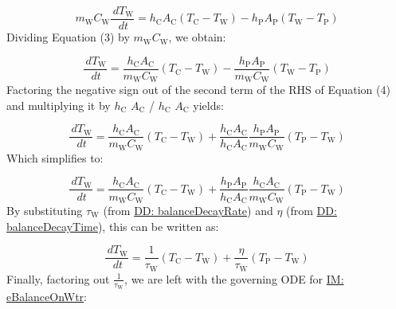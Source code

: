 \documentclass[12pt]{article}
\begin{document}
\begin{displaymath}
{m_{\text{W}}} {C_{\text{W}}} \frac{\,d{T_{\text{W}}}}{\,dt}={h_{\text{C}}} {A_{\text{C}}} \left({T_{\text{C}}}-{T_{\text{W}}}\right)-{h_{\text{P}}} {A_{\text{P}}} \left({T_{\text{W}}}-{T_{\text{P}}}\right)
\end{displaymath}
Dividing Equation (3) by ${m_{\text{W}}} {C_{\text{W}}}$, we obtain:

\begin{displaymath}
\frac{\,d{T_{\text{W}}}}{\,dt}=\frac{{h_{\text{C}}} {A_{\text{C}}}}{{m_{\text{W}}} {C_{\text{W}}}} \left({T_{\text{C}}}-{T_{\text{W}}}\right)-\frac{{h_{\text{P}}} {A_{\text{P}}}}{{m_{\text{W}}} {C_{\text{W}}}} \left({T_{\text{W}}}-{T_{\text{P}}}\right)
\end{displaymath}
Factoring the negative sign out of the second term of the RHS of Equation (4) and multiplying it by ${h_{\text{C}}}$ ${A_{\text{C}}}$ / ${h_{\text{C}}}$ ${A_{\text{C}}}$ yields:

\begin{displaymath}
\frac{\,d{T_{\text{W}}}}{\,dt}=\frac{{h_{\text{C}}} {A_{\text{C}}}}{{m_{\text{W}}} {C_{\text{W}}}} \left({T_{\text{C}}}-{T_{\text{W}}}\right)+\frac{{h_{\text{C}}} {A_{\text{C}}}}{{h_{\text{C}}} {A_{\text{C}}}} \frac{{h_{\text{P}}} {A_{\text{P}}}}{{m_{\text{W}}} {C_{\text{W}}}} \left({T_{\text{P}}}-{T_{\text{W}}}\right)
\end{displaymath}
Which simplifies to:

\begin{displaymath}
\frac{\,d{T_{\text{W}}}}{\,dt}=\frac{{h_{\text{C}}} {A_{\text{C}}}}{{m_{\text{W}}} {C_{\text{W}}}} \left({T_{\text{C}}}-{T_{\text{W}}}\right)+\frac{{h_{\text{P}}} {A_{\text{P}}}}{{h_{\text{C}}} {A_{\text{C}}}} \frac{{h_{\text{C}}} {A_{\text{C}}}}{{m_{\text{W}}} {C_{\text{W}}}} \left({T_{\text{P}}}-{T_{\text{W}}}\right)
\end{displaymath}
By substituting ${τ_{\text{W}}}$ (from \hyperref[DD:balanceDecayRate]{DD: balanceDecayRate}) and $η$ (from \hyperref[DD:balanceDecayTime]{DD: balanceDecayTime}), this can be written as:

\begin{displaymath}
\frac{\,d{T_{\text{W}}}}{\,dt}=\frac{1}{{τ_{\text{W}}}} \left({T_{\text{C}}}-{T_{\text{W}}}\right)+\frac{η}{{τ_{\text{W}}}} \left({T_{\text{P}}}-{T_{\text{W}}}\right)
\end{displaymath}
Finally, factoring out $\frac{1}{{τ_{\text{W}}}}$, we are left with the governing ODE for \hyperref[IM:eBalanceOnWtr]{IM: eBalanceOnWtr}:
\end{document}
